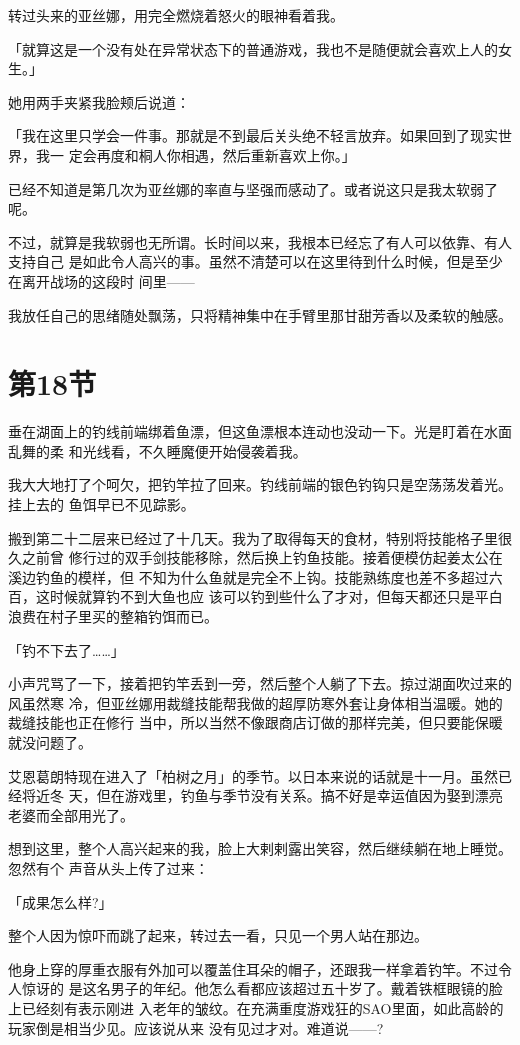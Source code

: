 \documentclass[11pt]{book}
\begin{document}
转过头来的亚丝娜，用完全燃烧着怒火的眼神看着我。

「就算这是一个没有处在异常状态下的普通游戏，我也不是随便就会喜欢上人的女生。」

她用两手夹紧我脸颊后说道：

「我在这里只学会一件事。那就是不到最后关头绝不轻言放弃。如果回到了现实世界，我一
定会再度和桐人你相遇，然后重新喜欢上你。」

已经不知道是第几次为亚丝娜的率直与坚强而感动了。或者说这只是我太软弱了呢。

不过，就算是我软弱也无所谓。长时间以来，我根本已经忘了有人可以依靠、有人支持自己
是如此令人高兴的事。虽然不清楚可以在这里待到什么时候，但是至少在离开战场的这段时
间里——

我放任自己的思绪随处飘荡，只将精神集中在手臂里那甘甜芳香以及柔软的触感。
\section{第18节}
\label{sec:org0a47a39}
垂在湖面上的钓线前端绑着鱼漂，但这鱼漂根本连动也没动一下。光是盯着在水面乱舞的柔
和光线看，不久睡魔便开始侵袭着我。

我大大地打了个呵欠，把钓竿拉了回来。钓线前端的银色钓钩只是空荡荡发着光。挂上去的
鱼饵早已不见踪影。

搬到第二十二层来已经过了十几天。我为了取得每天的食材，特别将技能格子里很久之前曾
修行过的双手剑技能移除，然后换上钓鱼技能。接着便模仿起姜太公在溪边钓鱼的模样，但
不知为什么鱼就是完全不上钩。技能熟练度也差不多超过六百，这时候就算钓不到大鱼也应
该可以钓到些什么了才对，但每天都还只是平白浪费在村子里买的整箱钓饵而已。

「钓不下去了……」

小声咒骂了一下，接着把钓竿丢到一旁，然后整个人躺了下去。掠过湖面吹过来的风虽然寒
冷，但亚丝娜用裁缝技能帮我做的超厚防寒外套让身体相当温暖。她的裁缝技能也正在修行
当中，所以当然不像跟商店订做的那样完美，但只要能保暖就没问题了。

艾恩葛朗特现在进入了「柏树之月」的季节。以日本来说的话就是十一月。虽然已经将近冬
天，但在游戏里，钓鱼与季节没有关系。搞不好是幸运值因为娶到漂亮老婆而全部用光了。

想到这里，整个人高兴起来的我，脸上大剌剌露出笑容，然后继续躺在地上睡觉。忽然有个
声音从头上传了过来：

「成果怎么样?」

整个人因为惊吓而跳了起来，转过去一看，只见一个男人站在那边。

他身上穿的厚重衣服有外加可以覆盖住耳朵的帽子，还跟我一样拿着钓竿。不过令人惊讶的
是这名男子的年纪。他怎么看都应该超过五十岁了。戴着铁框眼镜的脸上已经刻有表示刚进
入老年的皱纹。在充满重度游戏狂的SAO里面，如此高龄的玩家倒是相当少见。应该说从来
没有见过才对。难道说——?
\end{document}
